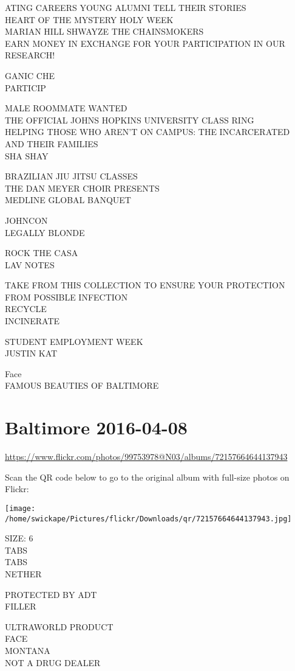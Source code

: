 \documentclass[10pt,letterpaper]{article}
\begin{document}
ATING CAREERS YOUNG ALUMNI TELL THEIR STORIES\\
HEART OF THE MYSTERY HOLY WEEK\\
MARIAN HILL SHWAYZE THE CHAINSMOKERS\\
EARN MONEY IN EXCHANGE FOR YOUR PARTICIPATION IN OUR RESEARCH!

GANIC CHE\\
PARTICIP

MALE ROOMMATE WANTED\\
THE OFFICIAL JOHNS HOPKINS UNIVERSITY CLASS RING\\
HELPING THOSE WHO AREN'T ON CAMPUS: THE INCARCERATED AND THEIR FAMILIES\\
SHA SHAY

BRAZILIAN JIU JITSU CLASSES\\
THE DAN MEYER CHOIR PRESENTS\\
MEDLINE GLOBAL BANQUET

JOHNCON\\
LEGALLY BLONDE

ROCK THE CASA\\
LAV NOTES

TAKE FROM THIS COLLECTION TO ENSURE YOUR PROTECTION FROM POSSIBLE INFECTION\\
RECYCLE\\
INCINERATE

STUDENT EMPLOYMENT WEEK\\
JUSTIN KAT

Face\\
FAMOUS BEAUTIES OF BALTIMORE
\pagebreak

\section*{Baltimore 2016-04-08}

\url{https://www.flickr.com/photos/99753978@N03/albums/72157664644137943}

Scan the QR code below to go to the original album with full-size photos on Flickr:

\texttt{[image: /home/swickape/Pictures/flickr/Downloads/qr/72157664644137943.jpg]}
\pagebreak

SIZE: 6\\
TABS\\
TABS\\
NETHER

PROTECTED BY ADT\\
FILLER

ULTRAWORLD PRODUCT\\
FACE\\
MONTANA\\
NOT A DRUG DEALER
\end{document}
